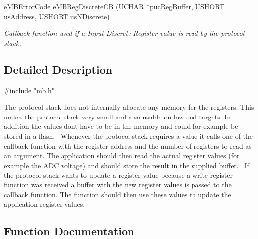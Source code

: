 \begin{DoxyCompactItemize}
\hyperlink{group__modbus_ga9e7fce8c431cb0e521c67f7f36dd823d}{e\+M\+B\+Error\+Code} \hyperlink{group__modbus__registers_ga38101f5da54af137e210a3b8b9fa3887}{e\+M\+B\+Reg\+Discrete\+CB} (U\+C\+H\+AR $\ast$puc\+Reg\+Buffer, U\+S\+H\+O\+RT us\+Address, U\+S\+H\+O\+RT us\+N\+Discrete)
\begin{DoxyCompactList}\small\item\em Callback function used if a {\itshape Input Discrete Register} value is read by the protocol stack. \end{DoxyCompactList}\end{DoxyCompactItemize}


\subsection{Detailed Description}

\begin{DoxyCode}
\textcolor{preprocessor}{#include "mb.h"} 
\end{DoxyCode}
 The protocol stack does not internally allocate any memory for the registers. This makes the protocol stack very small and also usable on low end targets. In addition the values don\textquotesingle{}t have to be in the memory and could for example be stored in a flash.~\newline
 Whenever the protocol stack requires a value it calls one of the callback function with the register address and the number of registers to read as an argument. The application should then read the actual register values (for example the A\+DC voltage) and should store the result in the supplied buffer.~\newline
 If the protocol stack wants to update a register value because a write register function was received a buffer with the new register values is passed to the callback function. The function should then use these values to update the application register values. 

\subsection{Function Documentation}
